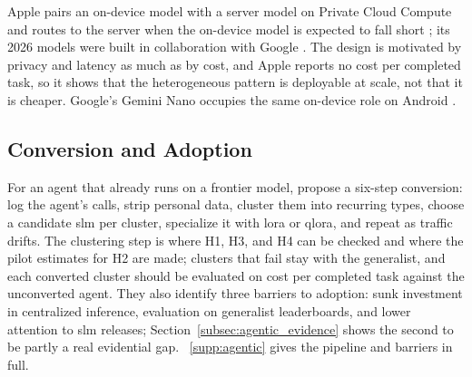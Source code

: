 Apple pairs an on-device model with a server model on Private Cloud Compute and routes to the server when the on-device model is expected to fall short \citep{gunter2025afm}; its 2026 models were built in collaboration with Google \citep{apple2026afm3,google_apple2026statement}. The design is motivated by privacy and latency as much as by cost, and Apple reports no cost per completed task, so it shows that the heterogeneous pattern is deployable at scale, not that it is cheaper. Google's Gemini Nano occupies the same on-device role on Android \citep{gemini2023}.

\subsection{Conversion and Adoption}
\label{subsec:agentic_conversion_summary}
For an agent that already runs on a frontier model, \citet{belcak2025slm_agentic} propose a six-step conversion: log the agent's calls, strip personal data, cluster them into recurring types, choose a candidate \gls{slm} per cluster, specialize it with \gls{lora} or \gls{qlora}, and repeat as traffic drifts. The clustering step is where H1, H3, and H4 can be checked and where the pilot estimates for H2 are made; clusters that fail stay with the generalist, and each converted cluster should be evaluated on cost per completed task against the unconverted agent. They also identify three barriers to adoption: sunk investment in centralized inference, evaluation on generalist leaderboards, and lower attention to \gls{slm} releases; Section~\ref{subsec:agentic_evidence} shows the second to be partly a real evidential gap. \suppsec~\ref{supp:agentic} gives the pipeline and barriers in full.
